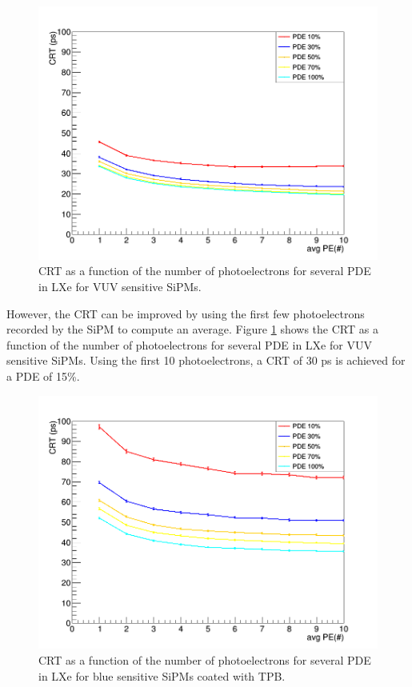 \documentclass[review]{elsarticle}
\begin{document}
\begin{figure}[!bhtp]
	\centering
	\includegraphics[scale=0.5]{../img/lxe_noCher_avg_npe.png}
	\caption{\label{fig.crt4} CRT as a function of the number of photoelectrons for several PDE in LXe for VUV sensitive SiPMs.}
\end{figure}

However, the CRT can be improved by using the first few photoelectrons recorded by the SiPM to compute an average. 
Figure \ref{fig.crt4} shows the CRT as a function of the number of photoelectrons for several PDE in LXe for VUV sensitive SiPMs. Using the first 10 photoelectrons, a CRT of 30 ps is achieved for a PDE of 15\%. 

\begin{figure}[!bhtp]
	\centering
	\includegraphics[scale=0.5]{../img/lxe_tpb_noCher_avg_npe.png}
	\caption{\label{fig.crt5} CRT as a function of the number of photoelectrons for several PDE in LXe for blue sensitive SiPMs coated with TPB.}
\end{figure}
\end{document}
